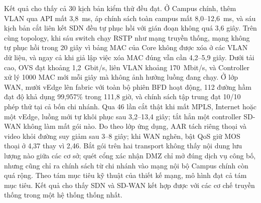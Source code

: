 Kết quả cho thấy cả 30 kịch bản kiểm thử đều đạt. Ở Campus chính, thêm VLAN qua API mất 3,8~ms, áp chính sách toàn campus mất 8,0--12,6~ms, và sáu kịch bản cắt liên kết SDN đều tự phục hồi với gián đoạn không quá 3,6 giây. Trên cùng topology, khi sáu switch chạy RSTP như mạng truyền thống, mạng không tự phục hồi trong 20 giây vì bảng MAC của Core không được xóa ở các VLAN dữ liệu, và ngay cả khi giả lập việc xóa MAC đúng vẫn cần 4,2--5,9 giây. Dưới tải cao, OVS đạt khoảng 1,2~Gbit/s, liên VLAN khoảng 170~Mbit/s, và Controller xử lý 1000 MAC mới mỗi giây mà không ảnh hưởng luồng đang chạy. Ở lớp WAN, mười vEdge lên fabric với toàn bộ phiên BFD hoạt động, 112 đường hầm đạt độ khả dụng 99,957\% trong 111,8 giờ, và chính sách tập trung đạt 10/10 phép thử tại cả bốn chi nhánh. Qua 46 lần cắt thật khi mất MPLS, Internet hoặc một vEdge, luồng mới tự khôi phục sau 3,2--13,4 giây; tắt hẳn một controller SD-WAN không làm mất gói nào. Đo theo lớp ứng dụng, AAR tách riêng thoại và video khỏi đường suy giảm sau 3--8 giây; khi WAN nghẽn, bật QoS giữ MOS thoại ở 4,37 thay vì 2,46. Bắt gói trên hai transport không thấy nội dung lưu lượng nào giữa các cơ sở; quét cổng xác nhận DMZ chỉ mở đúng dịch vụ công bố, nhưng cũng chỉ ra chính sách từ chi nhánh vào mạng nội bộ Campus chính còn quá rộng. Theo tám mục tiêu kỹ thuật của thiết kế mạng, mô hình đạt cả tám mục tiêu. Kết quả cho thấy SDN và SD-WAN kết hợp được với các cơ chế truyền thống trong một hệ thống thống nhất.
\newpage
